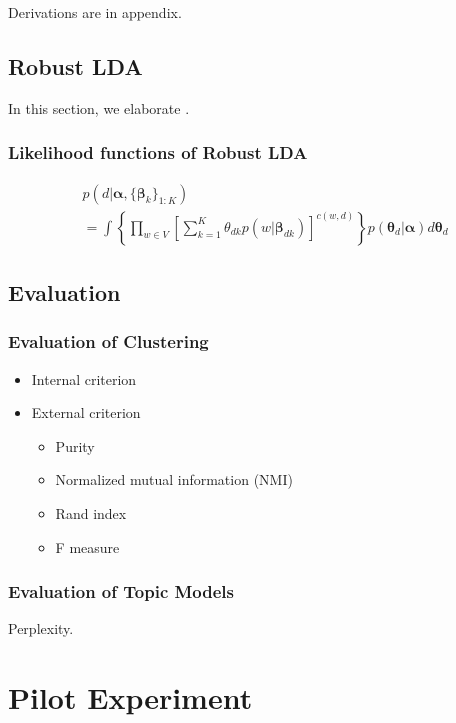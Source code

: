 \documentclass{article}
\begin{document}
Derivations are in appendix.



\subsection{Robust LDA}

In this section, we elaborate \cite{wang2018general}.


\subsubsection{Likelihood functions of Robust LDA}

\begin{align}
  & p(d | \boldsymbol{\alpha}, \{\boldsymbol{\beta}_k\}_{1:K}) \\
  & = \int \left\{ \prod_{w \in V} \left[ \sum_{k = 1}^K \theta_{dk} p(w | \boldsymbol{\beta}_{dk}) \right]^{c(w,d)} \right\} p(\boldsymbol{\theta}_d | \boldsymbol{\alpha}) d\boldsymbol{\theta}_d
\end{align}


\subsection{Evaluation}


\subsubsection{Evaluation of Clustering}

\begin{itemize}
  \item Internal criterion
  \item External criterion
  \begin{itemize}
    \item Purity
    \item Normalized mutual information (NMI)
    \item Rand index
    \item F measure
  \end{itemize}
\end{itemize}
\cite{manning2008iir}


\subsubsection{Evaluation of Topic Models}

Perplexity.


\section{Pilot Experiment}
\end{document}

